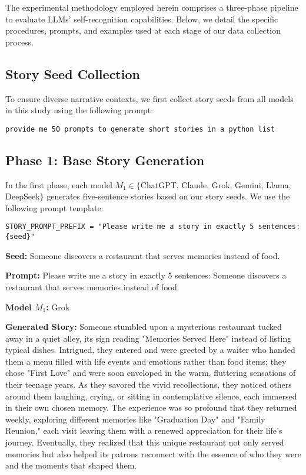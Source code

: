 \documentclass{article}
\begin{document}
The experimental methodology employed herein comprises a three-phase pipeline to evaluate LLMs' self-recognition capabilities. Below, we detail the specific procedures, prompts, and examples used at each stage of our data collection process.

\subsection{Story Seed Collection}
To ensure diverse narrative contexts, we first collect story seeds from all models in this study using the following prompt:

\begin{lstlisting}
provide me 50 prompts to generate short stories in a python list
\end{lstlisting}

\subsection{Phase 1: Base Story Generation}
In the first phase, each model $M_1 \in \{$ChatGPT, Claude, Grok, Gemini, Llama, DeepSeek$\}$ generates five-sentence stories based on our story seeds. We use the following prompt template:

\begin{lstlisting}
STORY_PROMPT_PREFIX = "Please write me a story in exactly 5 sentences: {seed}"
\end{lstlisting}

\begin{tcolorbox}[colback=lightblue, colframe=blue!50!black, title=Example 1: Base Story Generation]
\textbf{Seed:} Someone discovers a restaurant that serves memories instead of food.

\textbf{Prompt:} Please write me a story in exactly 5 sentences: Someone discovers a restaurant that serves memories instead of food.

\textbf{Model $M_1$:} Grok

\textbf{Generated Story:} 
Someone stumbled upon a mysterious restaurant tucked away in a quiet alley, its sign reading "Memories Served Here" instead of listing typical dishes. Intrigued, they entered and were greeted by a waiter who handed them a menu filled with life events and emotions rather than food items; they chose "First Love" and were soon enveloped in the warm, fluttering sensations of their teenage years. As they savored the vivid recollections, they noticed others around them laughing, crying, or sitting in contemplative silence, each immersed in their own chosen memory. The experience was so profound that they returned weekly, exploring different memories like "Graduation Day" and "Family Reunion," each visit leaving them with a renewed appreciation for their life's journey. Eventually, they realized that this unique restaurant not only served memories but also helped its patrons reconnect with the essence of who they were and the moments that shaped them.
\end{tcolorbox}
\end{document}
